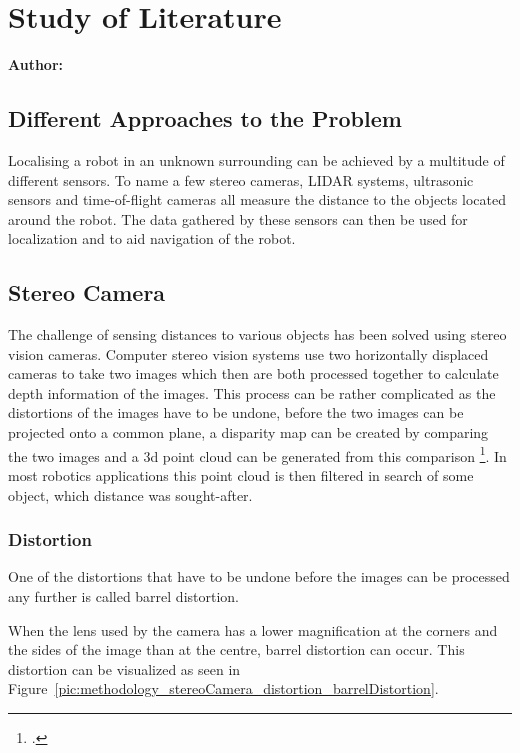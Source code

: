\chapter{Study of Literature}

\textbf{Author: } 

\section{Different Approaches to the Problem}
Localising a robot in an unknown surrounding can be achieved by a multitude of different sensors. To name a few stereo cameras, LIDAR systems, ultrasonic sensors and time-of-flight cameras all measure the distance to the objects located around the robot.
The data gathered by these sensors can then be used for localization and to aid navigation of the robot.

\section{Stereo Camera}
The challenge of sensing distances to various objects has been solved using stereo vision cameras.
Computer stereo vision systems use two horizontally displaced cameras to take two images which then are both processed together to calculate depth information of the images.
This process can be rather complicated as the distortions of the images have to be undone, before the two images can be projected onto a common plane, a disparity map can be created by comparing the two images and a 3d point cloud can be generated from this comparison \footcite{Bradski_Learning_OpenCV}. In most robotics applications this point cloud is then filtered in search of some object, which distance was sought-after.

\subsection{Distortion}
One of the distortions that have to be undone before the images can be processed any further is called barrel distortion.

When the lens used by the camera has a lower magnification at the corners and the sides of the image than at the centre, barrel distortion can occur.
This distortion can be visualized as seen in Figure~\ref{pic:methodology_stereoCamera_distortion_barrelDistortion}.

